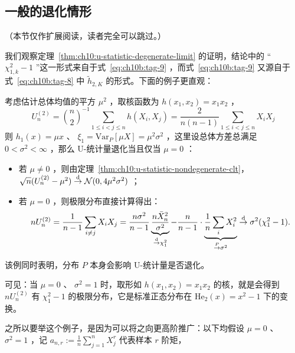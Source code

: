 \subsection{一般的退化情形}

（本节仅作扩展阅读，读者完全可以跳过。）

我们观察定理~\ref{thm:ch10:u-statistic-degenerate-limit} 的证明，结论中的 `` $\chi_{1,k}^2-1$ ''这一形式来自于式~\eqref{eq:ch10b:tag-9} ，而式~\eqref{eq:ch10b:tag-9} 又源自于式~\eqref{eq:ch10b:tag-8} 中 $\widetilde h_{2,K}$ 的形式。下面的例子更直观：

\begin{example}\label{ex:ch10:mean-square}
考虑估计总体均值的平方 $\mu^2$ ，取核函数为 $h(x_1,x_2)=x_1x_2$ ，
\[U^{(2)}_n=\binom n2^{-1}\sum_{1\le i<j\le n}h(X_i,X_j)=\frac2{n(n-1)}\sum_{1\le i<j\le n} X_iX_j\]
则 $h_1(x)=\mu x$ 、 $\xi_1=\mathrm{Var}_P[\mu X]=\mu^2\sigma^2$ ，这里设总体方差总满足 $0<\sigma^2<\infty$ ，那么 U-统计量退化当且仅当 $\mu=0$ ：

\begin{itemize}
\tightlist
\item
  若 $\mu\ne 0$ ，则由定理~\ref{thm:ch10:u-statistic-nondegenerate-clt}， $\sqrt n(U^{(2)}_n-\mu^2)\overset{\rm d}\to \mathcal N(0,4\mu^2\sigma^2)$ ；
\item
  若 $\mu=0$ ，则极限分布直接计算得出：
  \[  nU^{(2)}_n = \frac{1}{n-1} \sum_{i\neq j} X_i X_j = \frac{n\sigma^2}{n-1}\underbrace{\frac{ n\bar{X}_n^2}{\sigma^2}}_{\overset{\rm d}\to\chi_1^2} - \frac{n}{n-1} \cdot \underbrace{\frac{1}{n}\sum_i X_i^2}_{\overset P\to\sigma^2}\overset{\rm d}\to\sigma^2(\chi_1^2-1).
  \]\end{itemize}

\begin{remark}
该例同时表明，分布 $P$ 本身会影响 U-统计量是否退化。
\end{remark}


可见：当 $\mu=0$ 、 $\sigma^2=1$ 时，取形如 $h(x_1,x_2)=x_1x_2$ 的核，就是会得到 $nU_n^{(2)}$ 有 $\chi_1^2-1$ 的极限分布，它是标准正态分布在 $\mathrm{He}_2(x)=x^2-1$ 下的变换。

之所以要举这个例子，是因为可以将之向更高阶推广：以下均假设 $\mu=0$ 、 $\sigma^2=1$ ，记 $\textstyle a_{n,r}:=\frac1n\sum_{j=1}^nX_j^r$ 代表样本 $r$ 阶矩，


\end{example}
